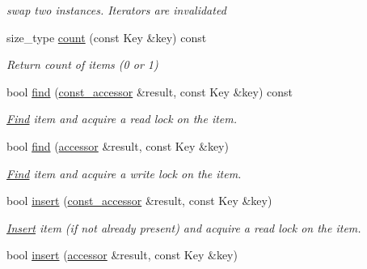 \begin{DoxyCompactItemize}
\begin{DoxyCompactList}\small\item\em swap two instances. Iterators are invalidated \end{DoxyCompactList}\item 
\hypertarget{classtbb_1_1interface5_1_1concurrent__hash__map_a7f9cb611a5effb650959cdde1b8ee901}{}size\+\_\+type \hyperlink{classtbb_1_1interface5_1_1concurrent__hash__map_a7f9cb611a5effb650959cdde1b8ee901}{count} (const Key \&key) const \label{classtbb_1_1interface5_1_1concurrent__hash__map_a7f9cb611a5effb650959cdde1b8ee901}

\begin{DoxyCompactList}\small\item\em Return count of items (0 or 1) \end{DoxyCompactList}\item 
bool \hyperlink{classtbb_1_1interface5_1_1concurrent__hash__map_a6d95753173af3646ba9281fd119f5733}{find} (\hyperlink{classtbb_1_1interface5_1_1concurrent__hash__map_1_1const__accessor}{const\+\_\+accessor} \&result, const Key \&key) const 
\begin{DoxyCompactList}\small\item\em \hyperlink{structFind}{Find} item and acquire a read lock on the item. \end{DoxyCompactList}\item 
bool \hyperlink{classtbb_1_1interface5_1_1concurrent__hash__map_aa7ff5cf736270e2076456d7cec38445f}{find} (\hyperlink{classtbb_1_1interface5_1_1concurrent__hash__map_1_1accessor}{accessor} \&result, const Key \&key)
\begin{DoxyCompactList}\small\item\em \hyperlink{structFind}{Find} item and acquire a write lock on the item. \end{DoxyCompactList}\item 
bool \hyperlink{classtbb_1_1interface5_1_1concurrent__hash__map_ae20cd9cdb08def2bcb2fd86c8276f52b}{insert} (\hyperlink{classtbb_1_1interface5_1_1concurrent__hash__map_1_1const__accessor}{const\+\_\+accessor} \&result, const Key \&key)
\begin{DoxyCompactList}\small\item\em \hyperlink{structInsert}{Insert} item (if not already present) and acquire a read lock on the item. \end{DoxyCompactList}\item 
bool \hyperlink{classtbb_1_1interface5_1_1concurrent__hash__map_a8b08213788c7124cab61ca40247a643a}{insert} (\hyperlink{classtbb_1_1interface5_1_1concurrent__hash__map_1_1accessor}{accessor} \&result, const Key \&key)

\end{DoxyCompactItemize}
